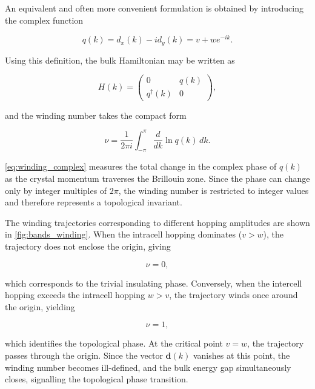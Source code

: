 \documentclass[11pt, a4paper]{article}
\begin{document}
An equivalent and often more convenient formulation is obtained by introducing the complex function

\begin{equation*}
q(k)
=
d_x(k)-id_y(k)
=
v+we^{-ik}.
\end{equation*}

Using this definition, the bulk Hamiltonian may be written as

\begin{equation*}
H(k)=
\begin{pmatrix}
0&q(k)\\
q^{\dagger}(k)&0
\end{pmatrix},
\end{equation*}

and the winding number takes the compact form

\begin{equation}
\nu
=
\frac{1}{2\pi i}
\int_{-\pi}^{\pi}
\frac{d}{dk}
\ln q(k)\,dk.
\label{eq:winding_complex}
\end{equation}

\cref{eq:winding_complex} measures the total change in the complex phase of
\(q(k)\) as the crystal momentum traverses the Brillouin zone. Since the phase can change only by integer multiples of \(2\pi\), the winding number is restricted to integer values and therefore represents a topological invariant.

The winding trajectories corresponding to different hopping amplitudes are shown in \cref{fig:bands_winding}. When the intracell hopping dominates (\(v>w\)), the trajectory does not enclose the origin, giving

\[
\nu=0,
\]

which corresponds to the trivial insulating phase. Conversely, when the intercell hopping exceeds the intracell hopping \(w>v\), the trajectory winds once around the origin, yielding

\[
\nu=1,
\]

which identifies the topological phase. At the critical point \(v=w\), the trajectory passes through the origin. Since the vector \(\mathbf d(k)\) vanishes at this point, the winding number becomes ill-defined, and the bulk energy gap simultaneously closes, signalling the topological phase transition.
\end{document}
